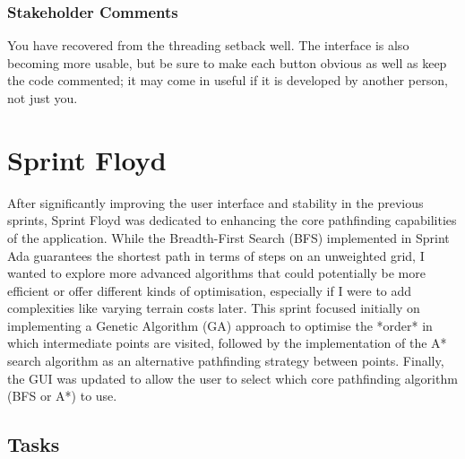 \subsubsection{Stakeholder Comments}

You have recovered from the threading setback well. The interface is also becoming more usable, but be sure to make each button obvious as well as keep the code commented; it may come in useful if it is developed by another person, not just you.

\newpage


\section{Sprint Floyd}

After significantly improving the user interface and stability in the previous sprints, Sprint Floyd was dedicated to enhancing the core pathfinding capabilities of the application. While the Breadth-First Search (BFS) implemented in Sprint Ada guarantees the shortest path in terms of steps on an unweighted grid, I wanted to explore more advanced algorithms that could potentially be more efficient or offer different kinds of optimisation, especially if I were to add complexities like varying terrain costs later. This sprint focused initially on implementing a Genetic Algorithm (GA) approach to optimise the *order* in which intermediate points are visited, followed by the implementation of the A* search algorithm as an alternative pathfinding strategy between points. Finally, the GUI was updated to allow the user to select which core pathfinding algorithm (BFS or A*) to use.

\subsection{Tasks} 

